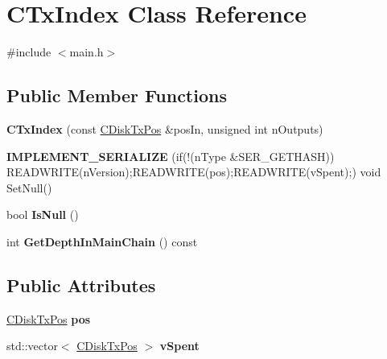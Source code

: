 \hypertarget{class_c_tx_index}{}\section{C\+Tx\+Index Class Reference}
\label{class_c_tx_index}


{\ttfamily \#include $<$main.\+h$>$}

\subsection*{Public Member Functions}
\begin{DoxyCompactItemize}
\item 
\mbox{\label{class_c_tx_index_ad01109597d73bef7ea576d1e1613415f}} 
{\bfseries C\+Tx\+Index} (const \mbox{\hyperlink{class_c_disk_tx_pos}{C\+Disk\+Tx\+Pos}} \&pos\+In, unsigned int n\+Outputs)
\item 
\mbox{\label{class_c_tx_index_ab6cf8a97430df57a520037bacdd9c6d0}} 
{\bfseries I\+M\+P\+L\+E\+M\+E\+N\+T\+\_\+\+S\+E\+R\+I\+A\+L\+I\+ZE} (if(!(n\+Type \&S\+E\+R\+\_\+\+G\+E\+T\+H\+A\+SH)) R\+E\+A\+D\+W\+R\+I\+TE(n\+Version);R\+E\+A\+D\+W\+R\+I\+TE(pos);R\+E\+A\+D\+W\+R\+I\+TE(v\+Spent);) void Set\+Null()
\item 
\mbox{\label{class_c_tx_index_a27f2d2e6bc1fad724bd5bff9eeb694fc}} 
bool {\bfseries Is\+Null} ()
\item 
\mbox{\label{class_c_tx_index_ae18990b9796ee365ae2f384a2b334fe0}} 
int {\bfseries Get\+Depth\+In\+Main\+Chain} () const
\end{DoxyCompactItemize}
\subsection*{Public Attributes}
\begin{DoxyCompactItemize}
\item 
\mbox{\label{class_c_tx_index_ac68a69ed4335b3f50b954c71ec0a9c32}} 
\mbox{\hyperlink{class_c_disk_tx_pos}{C\+Disk\+Tx\+Pos}} {\bfseries pos}
\item 
\mbox{\label{class_c_tx_index_a88317d56c02acd1faec4863bcb293d2c}} 
std\+::vector$<$ \mbox{\hyperlink{class_c_disk_tx_pos}{C\+Disk\+Tx\+Pos}} $>$ {\bfseries v\+Spent}
\end{DoxyCompactItemize}

